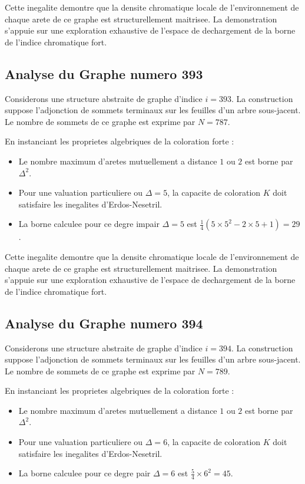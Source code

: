 \documentclass[11pt,a4paper]{article}
\begin{document}
Cette inegalite demontre que la densite chromatique locale de l'environnement de chaque arete de ce graphe est structurellement maitrisee. La demonstration s'appuie sur une exploration exhaustive de l'espace de dechargement de la borne de l'indice chromatique fort.

\subsection{Analyse du Graphe numero 393}
Considerons une structure abstraite de graphe d'indice $i = 393$. La construction suppose l'adjonction de sommets terminaux sur les feuilles d'un arbre sous-jacent. Le nombre de sommets de ce graphe est exprime par $N = 787$.

En instanciant les proprietes algebriques de la coloration forte :
\begin{itemize}
\item Le nombre maximum d'aretes mutuellement a distance $1$ ou $2$ est borne par $\Delta^2$.
\item Pour une valuation particuliere ou $\Delta = 5$, la capacite de coloration $K$ doit satisfaire les inegalites d'Erdos-Nesetril.
\item La borne calculee pour ce degre impair $\Delta = 5$ est $\frac{1}{4}(5 \times 5^2 - 2 \times 5 + 1) = 29$.
\end{itemize}

Cette inegalite demontre que la densite chromatique locale de l'environnement de chaque arete de ce graphe est structurellement maitrisee. La demonstration s'appuie sur une exploration exhaustive de l'espace de dechargement de la borne de l'indice chromatique fort.

\subsection{Analyse du Graphe numero 394}
Considerons une structure abstraite de graphe d'indice $i = 394$. La construction suppose l'adjonction de sommets terminaux sur les feuilles d'un arbre sous-jacent. Le nombre de sommets de ce graphe est exprime par $N = 789$.

En instanciant les proprietes algebriques de la coloration forte :
\begin{itemize}
\item Le nombre maximum d'aretes mutuellement a distance $1$ ou $2$ est borne par $\Delta^2$.
\item Pour une valuation particuliere ou $\Delta = 6$, la capacite de coloration $K$ doit satisfaire les inegalites d'Erdos-Nesetril.
\item La borne calculee pour ce degre pair $\Delta = 6$ est $\frac{5}{4} \times 6^2 = 45$.
\end{itemize}
\end{document}
